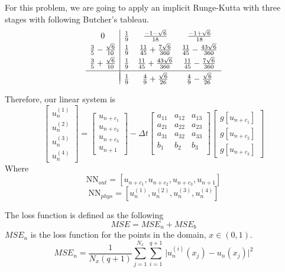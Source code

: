 \documentclass[a4paper,12pt]{article}
\theoremstyle{definition}
\begin{document}
For this problem, we are going to apply an implicit Runge-Kutta with three stages with following
Butcher's tableau.
\begin{equation}
\begin{array}{c|ccc}
    0 & \frac{1}{9} &  \frac{-1-\sqrt{6}}{18} &  
    \frac{-1+\sqrt{6}}{18}\\[0.25em]
    \frac{3}{5} - \frac{\sqrt{6}}{10} & \frac{1}{9} & \frac{11}{45} + 
    \frac{7\sqrt{6}}{360} & \frac{11}{45} - \frac{43\sqrt{6}}{360} \\[0.25em]
    \frac{3}{5} + \frac{\sqrt{6}}{10} & \frac{1}{9} &
    \frac{11}{45} + \frac{43\sqrt{6}}{360} & \frac{11}{45} - \frac{7\sqrt{6}}{360}\\[0.25em]
    \hline \\[-1em]
    & \frac{1}{9} & \frac{4}{9} + \frac{\sqrt{6}}{26} &
    \frac{4}{9} - \frac{\sqrt{6}}{26}
    \end{array}
\end{equation}

Therefore, our linear system is 
\begin{equation}
\begin{bmatrix}
u_n^{(1)} \\ u_n^{(2)} \\ u_n^{(3)} \\ u_n^{(4)} 
\end{bmatrix}
=
\begin{bmatrix}
u_{n+c_1} \\ u_{n+c_2} \\ u_{n+c_3} \\ u_{n+1} 
\end{bmatrix}
-
\Delta t
\begin{bmatrix}
a_{11} & a_{12} & a_{13} \\
a_{21} & a_{22} & a_{23} \\
a_{31} & a_{32} & a_{33} \\
b_{1} & b_{2} & b_{3} \\
\end{bmatrix}
\begin{bmatrix}
g[u_{n+c_1}] \\ g[u_{n+c_2}] \\ g[u_{n+c_3}]
\end{bmatrix}
\end{equation}
Where 
$$
\text{NN}_{out} = [u_{n+c_1}, u_{n+c_2}, u_{n+c_3}, u_{n+1}]
$$
$$
\text{NN}_{phys} = [u_n^{(1)}, u_n^{(2)}, u_n^{(3)}, u_n^(4)]
$$

The loss function is defined as the following
\begin{equation}
MSE = MSE_n + MSE_b
\end{equation}
$MSE_n$ is the loss function for the points in the domain, $x \in (0, 1)$.
\begin{equation}
    MSE_n = \frac{1}{N_x  (q+1)}
    \sum_{j=1}^{N_x} \sum_{i=1}^{q+1} \,
    \Big| u^{(i)}_n(x_j) - u_n(x_j) \Big|^2
\end{equation}
\end{document}
